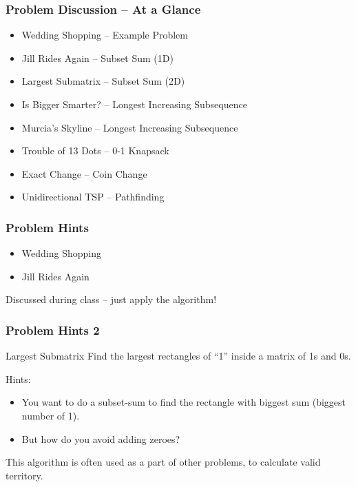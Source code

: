 

\begin{frame}
   \frametitle{Problem Discussion -- At a Glance}
   \begin{itemize}
   \item Wedding Shopping -- Example Problem     
   \item Jill Rides Again -- Subset Sum (1D)
   \item Largest Submatrix -- Subset Sum (2D)
   \item Is Bigger Smarter? -- Longest Increasing Subsequence
   \item Murcia's Skyline -- Longest Increasing Subsequence
   \item Trouble of 13 Dots -- 0-1 Knapsack
   \item Exact Change -- Coin Change
   \item Unidirectional TSP -- Pathfinding
   \end{itemize}
\end{frame}

\begin{frame}
  \frametitle{Problem Hints}

  \begin{itemize}
  \item Wedding Shopping
  \item Jill Rides Again
  \end{itemize}

  \vfill
  
  Discussed during class -- just apply the algorithm!
\end{frame}

\begin{frame}
  \frametitle{Problem Hints 2}

  \begin{block}{Largest Submatrix}
    Find the largest rectangles of ``1'' inside a matrix of 1s and 0s.
  \end{block}

  \bigskip

  Hints:
  \begin{itemize}
  \item You want to do a subset-sum to find the rectangle with biggest
    sum (biggest number of 1).
  \item But how do you avoid adding zeroes?
  \end{itemize}

  \bigskip

  This algorithm is often used as a part of other problems, to
  \alert{calculate valid territory}.
\end{frame}

